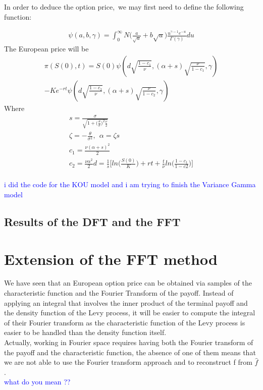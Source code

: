 \documentclass[12pt]{report}
\begin{document}
In order to deduce the option price,~we may first need to define the following function:

\begin{gather} 
\psi(a,b,\gamma)=\int_{0}^{\infty} N\big(\frac{a}{\sqrt{u}}+ b \sqrt{u} \big) \frac{u^{\gamma-1} e^{-u}}{\Gamma(\gamma)}du
\end{gather}
The European price will be 
\begin{align}
\pi(S(0),t)=S(0)\psi(d \sqrt{\frac{1-c_1}{\nu}},(\alpha+s)\sqrt{\frac{\nu}{1-c_1}},\gamma) \nonumber \\
-Ke^{-rt}\psi(d \sqrt{\frac{1-c_2}{\nu}},(\alpha+s)\sqrt{\frac{\nu}{1-c_2}},\gamma) 
\end{align}
Where 
\begin{gather*}
s=\frac{\sigma}{\sqrt{1+\big(\frac{\theta}{\sigma}\big)^2 \frac{\nu}{2}}}\\
\zeta=-\frac{\theta }{\sigma^2},~~\alpha=\zeta s \\
c_1=\frac{\nu(\alpha+s)^2}{2}\\
c_2=\frac{\nu \alpha^2}{2}
d=\frac{1}{s}\big[ ln\big(\frac{S(0)}{K}\big)+rt+\frac{t}{\nu} ln \big( \frac{1-c_1}{1-c2}\big)\big]\\
\end{gather*}

\textcolor{blue}{i did the code for the KOU model and i am trying to finish the Variance Gamma model} 

\section{Results of the DFT and the FFT}
\chapter{Extension of the FFT method }

We have seen that an European option price can be obtained via samples of the characteristic function and the Fourier Transform of the payoff. Instead of applying an integral that involves the inner product of the terminal payoff and the density function of the Levy process, it will be easier to compute the integral of their Fourier transform as the characteristic function  of the Levy process is easier to be handled than the density function itself.\\

Actually, working in Fourier space  requires having both the Fourier transform of the payoff and the characteristic function, the absence of one of them means that we are not able to use  the Fourier transform approach and to reconstruct f from $\hat f$ . \\
 \textcolor{blue}{what do you mean ??}\\
\end{document}

